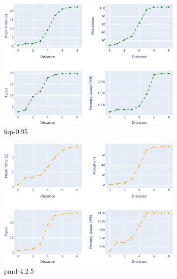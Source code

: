 \begin{figure}[htbp]
\begin{subfigure}[b]{0.45\textwidth}
\captionsetup{margin=0cm}  %
\includegraphics[width=\textwidth]{figures/fop-0.95_distance_evaluation.pdf}
\caption{fop-0.95}
\end{subfigure}
\vspace{0.5cm}
\hfill
\begin{subfigure}[b]{0.45\textwidth}
\captionsetup{margin=0cm}  %
\includegraphics[width=\textwidth]{figures/pmd-4.2.5_distance_evaluation.pdf}
\caption{pmd-4.2.5}
\end{subfigure}
\vspace{0.5cm}
\\
\begin{subfigure}[b]{0.45\textwidth}

\end{subfigure}
\end{figure}
